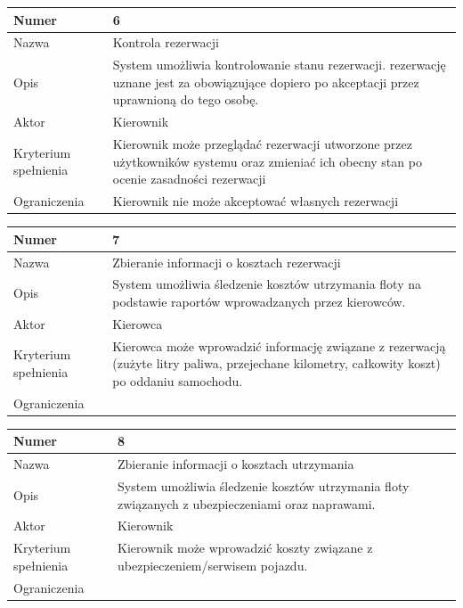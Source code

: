 \documentclass[eng,printmode,openany]{mgr}
\begin{document}
	\begin{table}[H]
		\begin{tabularx}{\textwidth}{|l|X|}
			\hline
			Numer                & 6 \\ \hline
			Nazwa                & Kontrola rezerwacji\\ \hline
			Opis                 & System umożliwia kontrolowanie stanu rezerwacji. rezerwację uznane jest za obowiązujące dopiero po akceptacji przez uprawnioną do tego osobę.\\ \hline
			Aktor                & Kierownik \\ \hline
			Kryterium spełnienia & Kierownik może przeglądać rezerwacji utworzone przez użytkowników systemu oraz zmieniać ich obecny stan po ocenie zasadności rezerwacji \\ \hline
			Ograniczenia         & Kierownik nie może akceptować własnych rezerwacji \\ \hline
		\end{tabularx}
	\end{table}
	
	\begin{table}[H]
		\begin{tabularx}{\textwidth}{|l|X|}
			\hline
			Numer                & 7 \\ \hline
			Nazwa                & Zbieranie informacji o kosztach rezerwacji\\ \hline
			Opis                 & System umożliwia śledzenie kosztów utrzymania floty na podstawie raportów wprowadzanych przez kierowców. \\ \hline
			Aktor                & Kierowca\\ \hline
			Kryterium spełnienia & Kierowca może wprowadzić informację związane z rezerwacją (zużyte litry paliwa, przejechane kilometry, całkowity koszt) po oddaniu samochodu.\\ \hline
			Ograniczenia         & \\ \hline
		\end{tabularx}
	\end{table}
	
	\begin{table}[H]
		\begin{tabularx}{\textwidth}{|l|X|}
			\hline
			Numer                & 8 \\ \hline
			Nazwa                & Zbieranie informacji o kosztach utrzymania \\ \hline
			Opis                 & System umożliwia śledzenie kosztów utrzymania floty związanych z ubezpieczeniami oraz naprawami. \\ \hline
			Aktor                & Kierownik \\ \hline
			Kryterium spełnienia & Kierownik może wprowadzić koszty związane z ubezpieczeniem/serwisem pojazdu. \\ \hline
			Ograniczenia         & \\ \hline
		\end{tabularx}
	\end{table}
	
\end{document}
